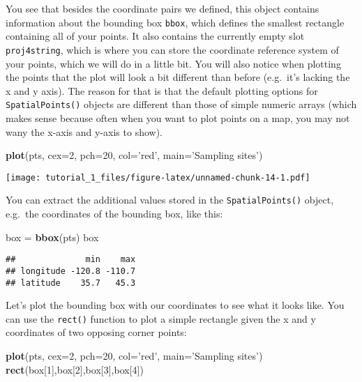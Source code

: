 \documentclass[]{article}
\newenvironment{Shaded}{\begin{snugshade}}{\end{snugshade}}
\newcommand{\DataTypeTok}[1]{\textcolor[rgb]{0.13,0.29,0.53}{#1}}
\newcommand{\DecValTok}[1]{\textcolor[rgb]{0.00,0.00,0.81}{#1}}
\newcommand{\KeywordTok}[1]{\textcolor[rgb]{0.13,0.29,0.53}{\textbf{#1}}}
\newcommand{\NormalTok}[1]{#1}
\newcommand{\StringTok}[1]{\textcolor[rgb]{0.31,0.60,0.02}{#1}}
\begin{document}
You see that besides the coordinate pairs we defined, this object
contains information about the bounding box \texttt{bbox}, which defines
the smallest rectangle containing all of your points. It also contains
the currently empty slot \texttt{proj4string}, which is where you can
store the coordinate reference system of your points, which we will do
in a little bit. You will also notice when plotting the points that the
plot will look a bit different than before (e.g.~it's lacking the x and
y axis). The reason for that is that the default plotting options for
\texttt{SpatialPoints()} objects are different than those of simple
numeric arrays (which makes sense because often when you want to plot
points on a map, you may not wany the x-axis and y-axis to show).

\begin{Shaded}
\begin{Highlighting}[]
\KeywordTok{plot}\NormalTok{(pts, }\DataTypeTok{cex=}\DecValTok{2}\NormalTok{, }\DataTypeTok{pch=}\DecValTok{20}\NormalTok{, }\DataTypeTok{col=}\StringTok{'red'}\NormalTok{, }\DataTypeTok{main=}\StringTok{'Sampling sites'}\NormalTok{)}
\end{Highlighting}
\end{Shaded}

\texttt{[image: tutorial\_1\_files/figure-latex/unnamed-chunk-14-1.pdf]}

You can extract the additional values stored in the
\texttt{SpatialPoints()} object, e.g.~the coordinates of the bounding
box, like this:

\begin{Shaded}
\begin{Highlighting}[]
\NormalTok{box =}\StringTok{ }\KeywordTok{bbox}\NormalTok{(pts)}
\NormalTok{box}
\end{Highlighting}
\end{Shaded}

\begin{verbatim}
##              min    max
## longitude -120.8 -110.7
## latitude    35.7   45.3
\end{verbatim}

Let's plot the bounding box with our coordinates to see what it looks
like. You can use the \texttt{rect()} function to plot a simple
rectangle given the x and y coordinates of two opposing corner points:

\begin{Shaded}
\begin{Highlighting}[]
\KeywordTok{plot}\NormalTok{(pts, }\DataTypeTok{cex=}\DecValTok{2}\NormalTok{, }\DataTypeTok{pch=}\DecValTok{20}\NormalTok{, }\DataTypeTok{col=}\StringTok{'red'}\NormalTok{, }\DataTypeTok{main=}\StringTok{'Sampling sites'}\NormalTok{)}
\KeywordTok{rect}\NormalTok{(box[}\DecValTok{1}\NormalTok{],box[}\DecValTok{2}\NormalTok{],box[}\DecValTok{3}\NormalTok{],box[}\DecValTok{4}\NormalTok{])}
\end{Highlighting}
\end{Shaded}
\end{document}
